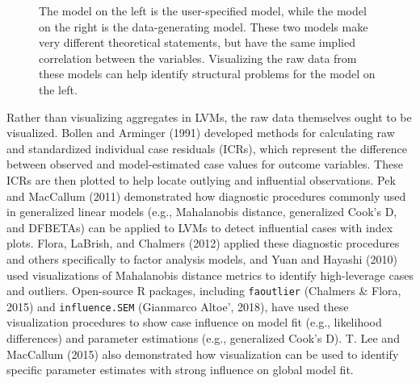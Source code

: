\documentclass[
  english,
  man]{apa6}
\begin{document}
\begin{figure}
\begin{center}
\caption{The model on the left is the user-specified model, while the model on the right is the data-generating model. These two models make very different theoretical statements, but have the same implied correlation between the variables. Visualizing the raw data from these models can help identify structural problems for the model on the left.}
\label{fig:implied}
\end{center}
\end{figure}

Rather than visualizing aggregates in LVMs, the raw data themselves ought to be visualized. Bollen and Arminger (1991) developed methods for calculating raw and standardized individual case residuals (ICRs), which represent the difference between observed and model-estimated case values for outcome variables. These ICRs are then plotted to help locate outlying and influential observations. Pek and MacCallum (2011) demonstrated how diagnostic procedures commonly used in generalized linear models (e.g., Mahalanobis distance, generalized Cook's D, and DFBETAs) can be applied to LVMs to detect influential cases with index plots. Flora, LaBrish, and Chalmers (2012) applied these diagnostic procedures and others specifically to factor analysis models, and Yuan and Hayashi (2010) used visualizations of Mahalanobis distance metrics to identify high-leverage cases and outliers. Open-source R packages, including \texttt{faoutlier} (Chalmers \& Flora, 2015) and \texttt{influence.SEM} (Gianmarco Altoe', 2018), have used these visualization procedures to show case influence on model fit (e.g., likelihood differences) and parameter estimations (e.g., generalized Cook's D). T. Lee and MacCallum (2015) also demonstrated how visualization can be used to identify specific parameter estimates with strong influence on global model fit.
\end{document}
